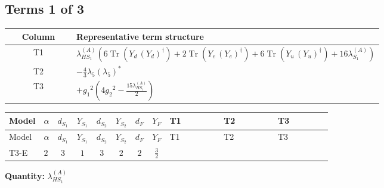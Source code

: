 \documentclass[8pt]{article}
\begin{document}
\begin{landscape}
\subsection*{Terms 1 of 3}
\begin{center}
\begin{tabular}{@{}c >{\raggedright\arraybackslash}p{0.82\linewidth}@{}}
\toprule
Column & Representative term structure \\
\midrule
T1 & \(\displaystyle {\lambda_{HS_1}^{(A)}} (6 \operatorname{Tr}\!\left({Y_d}\,\left({Y_d}\right)^{\dagger}\right)+2 \operatorname{Tr}\!\left({Y_e}\,\left({Y_e}\right)^{\dagger}\right)+6 \operatorname{Tr}\!\left({Y_u}\,\left({Y_u}\right)^{\dagger}\right)+16 {\lambda_{S_1}^{(A)}})\) \\
\midrule
T2 & \(\displaystyle -\frac{4}{3} {\lambda_5} \left({\lambda_5}\right)^{*}\) \\
\midrule
T3 & \(\displaystyle +{g_1}^2 \left(4 {g_2}^2-\frac{15 {\lambda_{HS_1}^{(A)}}}{2}\right)\) \\
\midrule
\bottomrule
\end{tabular}
\end{center}
\smallskip
\tiny
\begin{longtable}{@{}llcccccc >{\raggedright\arraybackslash}p{0.21\linewidth} >{\raggedright\arraybackslash}p{0.21\linewidth} >{\raggedright\arraybackslash}p{0.21\linewidth}@{}}
\toprule
Model & $\alpha$ & $d_{S_1}$ & $Y_{S_1}$ & $d_{S_2}$ & $Y_{S_2}$ & $d_F$ & $Y_F$ & T1 & T2 & T3 \\
\midrule
\endfirsthead
\toprule
Model & $\alpha$ & $d_{S_1}$ & $Y_{S_1}$ & $d_{S_2}$ & $Y_{S_2}$ & $d_F$ & $Y_F$ & T1 & T2 & T3 \\
\midrule
\endhead
T3-E & $2$ & $3$ & $1$ & $3$ & $2$ & $2$ & $\frac{3}{2}$ & \scriptsize\adjustbox{max width=\linewidth}{$\begin{gathered} {\lambda_{HS_1}^{(A)}} (6 \operatorname{Tr}\!\left({Y_d}\,\left({Y_d}\right)^{\dagger}\right)+2 \operatorname{Tr}\!\left({Y_e}\,\left({Y_e}\right)^{\dagger}\right)+6 \operatorname{Tr}\!\left({Y_u}\,\left({Y_u}\right)^{\dagger}\right)+16 {\lambda_{S_1}^{(A)}})\end{gathered}$} & \scriptsize\adjustbox{max width=\linewidth}{$\begin{gathered} -\frac{4}{3} {\lambda_5} \left({\lambda_5}\right)^{*}\end{gathered}$} & \scriptsize\adjustbox{max width=\linewidth}{$\begin{gathered} +{g_1}^2 \left(4 {g_2}^2-\frac{15 {\lambda_{HS_1}^{(A)}}}{2}\right)\end{gathered}$} \\
\midrule
\bottomrule
\end{longtable}
\clearpage
\noindent\textbf{Quantity: }$\lambda_{HS_1}^{(A)}$\par\smallskip

\end{landscape}
\end{document}
